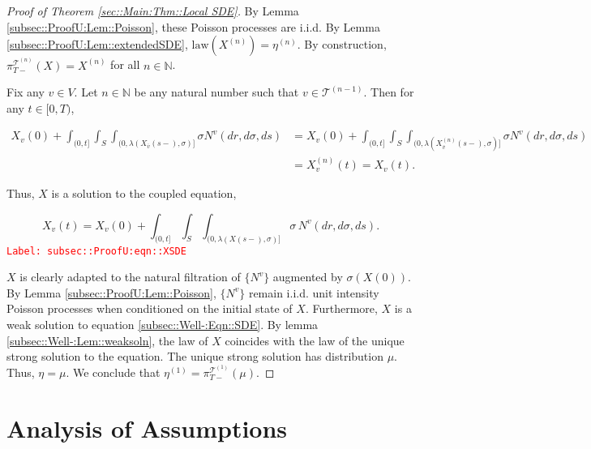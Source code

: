 \documentclass[12pt]{article}
\newcommand{\mb}{\mathbb}
\newcommand{\mc}{\mathcal}
\newcommand{\ov}{\overline}
\newcommand{\te}{\text}
\newcommand{\tr}{\textcolor{red}}
\newcommand{\labe}[1]{\tr{\texttt{Label: #1}}}
\newcommand{\ind}{\hspace{24pt}}
\renewcommand{\v}{v}							%
\renewcommand{\S}{S}							%
\newcommand{\s}{\sigma}							%
\newcommand{\T}{T}								%
\renewcommand{\t}{t}							%
\newcommand{\proj}{\pi}							%
\renewcommand{\tt}{s}							%
\newcommand{\X}{X}								%
\newcommand{\vind}[1]{^{#1}}					%
\newcommand{\vsi}[1]{^{#1}}						%
\newcommand{\cind}[1]{_{#1}}					%
\newcommand{\cl}{\ov}							%
\newcommand{\tp}[1]{(#1)}						%
\newcommand{\ts}[1]{_{#1}}						%
\newcommand{\tree}{\mc{T}}						%
\newcommand{\sln}[1]{^{(#1)}}					%
\newcommand{\poiss}{N}							%
\newcommand{\rate}{\lambda}						%
\renewcommand{\r}{r}							%
\newcommand{\m}{\mu}							%
\newcommand{\mmm}{\eta}							%
\begin{document}
\begin{proof}[Proof of Theorem \ref{sec::Main:Thm::Local SDE}]
By Lemma \ref{subsec::ProofU:Lem::Poisson}, these Poisson processes are i.i.d. By Lemma \ref{subsec::ProofU:Lem::extendedSDE}, \(\te{law}(\X\sln{n}) = \mmm\sln{n}\). By construction, \(\proj\vsi{\tree\sln{n}}\ts{\T-}(\X) = \X\sln{n}\) for all \(n\in\mb{N}\).

\ind Fix any \(\v\in V\). Let \(n\in \mb{N}\) be any natural number such that \(\v\in \tree\sln{n-1}\). Then for any \(\t \in [0,\T)\),

\begin{align*}
\X\cind{\v}\tp{0} + \int_{(0,\t]}\int_\S\int_{(0,\rate(\X\cind{\cl{\v}}\tp{\tt-},\s)]}\s\poiss\vind{\v}(d\r,d\s,d\tt) &= \X\cind{\v}\tp{0} + \int_{(0,\t]}\int_\S\int_{(0,\rate(\X\sln{n}\cind{\cl{\v}}\tp{\tt-},\s)]}\s\poiss\vind{\v}(d\r,d\s,d\tt)\\
&=\X\sln{n}\cind{\v}\tp{\t} = \X\cind{\v}\tp{\t}.
\end{align*}

Thus, \(\X\) is a solution to the coupled equation,

\begin{equation}
\X\cind{\v}\tp{\t} = \X\cind{\v}\tp{0} + \int_{(0,\t]}\int_\S \int_{(0,\rate(\X\tp{\tt-},\s)]}\s\,\poiss\vind{\v}(d\r,d\s,d\tt).
\label{subsec::ProofU:eqn::XSDE}
\end{equation}
\labe{subsec::ProofU:eqn::XSDE}

\(\X\) is clearly adapted to the natural filtration of \(\{\poiss\vind{\v}\}\) augmented by \(\sigma(\X\tp{0})\). By Lemma \ref{subsec::ProofU:Lem::Poisson}, \(\{\poiss\vind{\v}\}\) remain i.i.d. unit intensity Poisson processes when conditioned on the initial state of \(\X\). Furthermore, \(\X\) is a weak solution to equation \eqref{subsec::Well-:Eqn::SDE}. By lemma \ref{subsec::Well-:Lem::weaksoln}, the law of \(\X\) coincides with the law of the unique strong solution to the equation. The unique strong solution has distribution \(\m\). Thus, \(\mmm = \m\). We conclude that \(\mmm\sln{1} = \proj\vsi{\tree\sln{1}}\ts{\T-}(\m)\).

\end{proof}

\section{Analysis of Assumptions}
\end{document}
